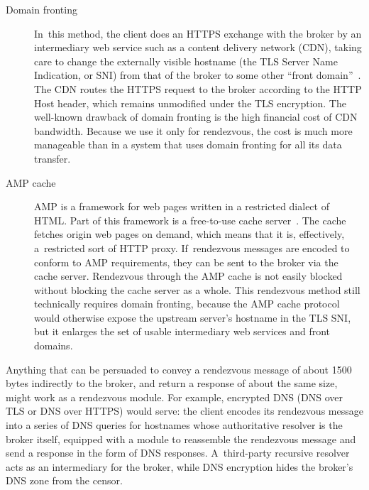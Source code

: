 \documentclass[letterpaper,twocolumn]{article}
\begin{document}
\begin{description}
\item[Domain fronting]
In~this method, the client does an HTTPS exchange with the broker
by an intermediary web service such as a content delivery network (CDN),
taking care to change the externally visible hostname
(the TLS Server Name Indication, or SNI)
from that of the broker to some other ``front domain''~\cite{Fifield2015a}.
The CDN routes the HTTPS request to the broker
according to the HTTP Host header, which remains unmodified
under the TLS encryption.
The well-known drawback of domain fronting
is the high financial cost of CDN bandwidth.
Because we use it only for rendezvous,
the cost is much more manageable than in a system
that uses domain fronting for all its data transfer.

\item[AMP cache]
AMP is a framework for web pages written in a restricted dialect of HTML.
Part of this framework is a free-to-use
cache server~\cite{amp-cache}.
The cache fetches origin web pages on demand,
which means that it is, effectively, a~restricted sort of HTTP proxy.
If~rendezvous messages are encoded to conform to AMP requirements,
they can be sent to the broker via the cache server.
Rendezvous through the AMP cache is not easily blocked
without blocking the cache server as a whole.
This rendezvous method still technically requires domain fronting,
because the AMP cache protocol would otherwise expose the
upstream server's hostname in the TLS SNI,
but it enlarges the set of usable intermediary web services and front domains.
\end{description}

Anything that can be persuaded to convey a rendezvous message
of about 1500 bytes indirectly to the broker,
and return a response of about the same size,
might work as a rendezvous module.
For example, encrypted DNS
(DNS over TLS or DNS over HTTPS) would serve:
the client encodes its rendezvous message into a series of DNS queries
for hostnames whose authoritative resolver is the broker itself,
equipped with a module to reassemble the rendezvous message
and send a response in the form of DNS responses.
A~third-party recursive resolver acts as an intermediary for the broker,
while DNS encryption hides the broker's DNS zone from the censor.
\end{document}
